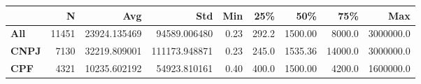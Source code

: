 \begin{tabular}{lrrrrrrrr}
\toprule
{} &     N &           Avg &            Std &   Min &    25\% &      50\% &      75\% &        Max \\
\midrule
\textbf{All } & 11451 &  23924.135469 &   94589.006480 &  0.23 &  292.2 &  1500.00 &   8000.0 &  3000000.0 \\
\textbf{CNPJ} &  7130 &  32219.809001 &  111173.948871 &  0.23 &  245.0 &  1535.36 &  14000.0 &  3000000.0 \\
\textbf{CPF } &  4321 &  10235.602192 &   54923.810161 &  0.40 &  400.0 &  1500.00 &   4200.0 &  1600000.0 \\
\bottomrule
\end{tabular}
